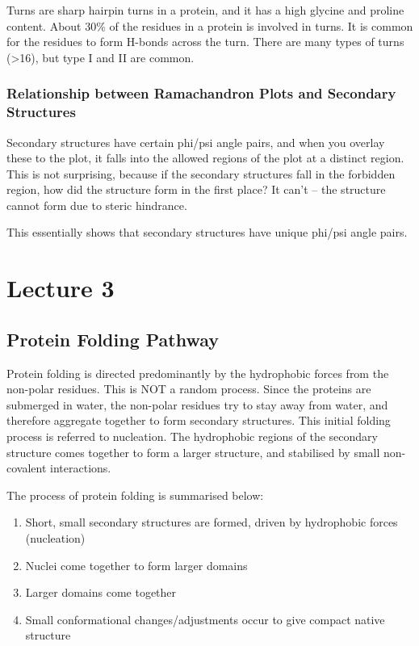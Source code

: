 \documentclass[a4paper, 12pt]{report}
\newcommand{\mychapter}[2]{
    \setcounter{chapter}{#1}
    \setcounter{section}{0}
    \chapter*{#2}
    \addcontentsline{toc}{chapter}{#2}
}
\begin{document}
Turns are sharp hairpin turns in a protein, and it has a high glycine and proline content.
About 30\% of the residues in a protein is involved in turns.
It is common for the residues to form H-bonds across the turn.
There are many types of turns (\textgreater16), but type I and II are common.

\subsection{Relationship between Ramachandron Plots and Secondary Structures}

Secondary structures have certain phi/psi angle pairs, and when you overlay these to the plot, it falls into the allowed regions of the plot at a distinct region.
This is not surprising, because if the secondary structures fall in the forbidden region, how did the structure form in the first place?
It can't -- the structure cannot form due to steric hindrance.

This essentially shows that secondary structures have unique phi/psi angle pairs.

\mychapter{3}{Lecture 3}

\section{Protein Folding Pathway}

Protein folding is directed predominantly by the hydrophobic forces from the non-polar residues.
This is NOT a random process.
Since the proteins are submerged in water, the non-polar residues try to stay away from water, and therefore aggregate together to form secondary structures.
This initial folding process is referred to nucleation.
The hydrophobic regions of the secondary structure comes together to form a larger structure, and stabilised by small non-covalent interactions.

\vspace{0.5cm}

\noindent
The process of protein folding is summarised below:
\begin{enumerate}
\item Short, small secondary structures are formed, driven by hydrophobic forces (nucleation)
\item Nuclei come together to form larger domains
\item Larger domains come together
\item Small conformational changes/adjustments occur to give compact native structure
\end{enumerate}
\end{document}
